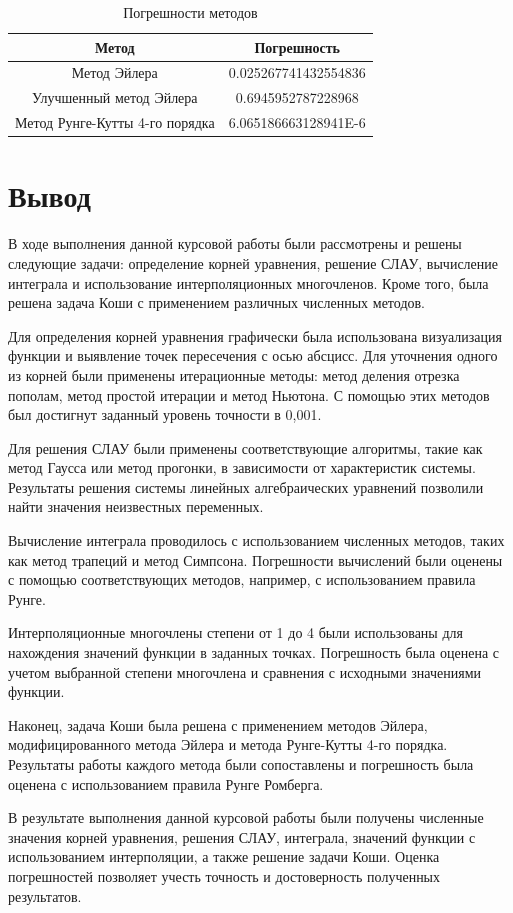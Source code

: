 \documentclass[12pt]{article}
\begin{document}
    \begin{table}[h]
        \centering
        \caption{Погрешности методов}
        \begin{tabular}{|c|c|}
            \hline
            \textbf{Метод}                 & \textbf{Погрешность} \\
            \hline
            Метод Эйлера                   & 0.025267741432554836              \\
            \hline
            Улучшенный метод Эйлера        & 0.6945952787228968          \\
            \hline
            Метод Рунге-Кутты 4-го порядка & 6.065186663128941E-6               \\
            \hline
        \end{tabular}
    \end{table}


    \section{Вывод}

    В ходе выполнения данной курсовой работы были рассмотрены и решены следующие задачи: определение корней уравнения, решение СЛАУ, вычисление интеграла и использование интерполяционных многочленов. Кроме того, была решена задача Коши с применением различных численных методов.

    Для определения корней уравнения графически была использована визуализация функции и выявление точек пересечения с осью абсцисс. Для уточнения одного из корней были применены итерационные методы: метод деления отрезка пополам, метод простой итерации и метод Ньютона. С помощью этих методов был достигнут заданный уровень точности в 0,001.

    Для решения СЛАУ были применены соответствующие алгоритмы, такие как метод Гаусса или метод прогонки, в зависимости от характеристик системы. Результаты решения системы линейных алгебраических уравнений позволили найти значения неизвестных переменных.

    Вычисление интеграла проводилось с использованием численных методов, таких как метод трапеций и метод Симпсона. Погрешности вычислений были оценены с помощью соответствующих методов, например, с использованием правила Рунге.

    Интерполяционные многочлены степени от 1 до 4 были использованы для нахождения значений функции в заданных точках. Погрешность была оценена с учетом выбранной степени многочлена и сравнения с исходными значениями функции.

    Наконец, задача Коши была решена с применением методов Эйлера, модифицированного метода Эйлера и метода Рунге-Кутты 4-го порядка. Результаты работы каждого метода были сопоставлены и погрешность была оценена с использованием правила Рунге Ромберга.

    В результате выполнения данной курсовой работы были получены численные значения корней уравнения, решения СЛАУ, интеграла, значений функции с использованием интерполяции, а также решение задачи Коши. Оценка погрешностей позволяет учесть точность и достоверность полученных результатов.
\end{document}
